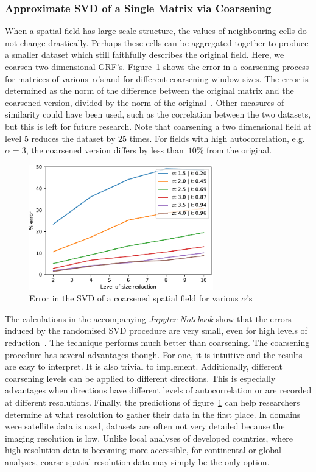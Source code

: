 \documentclass[ijgi,article,submit,moreauthors,pdftex,10pt,a4paper]{Definitions/mdpi}
\begin{document}
\subsubsection{Approximate SVD of a Single Matrix via Coarsening}
\label{sec:Results/Approximate SVD of a Single Matrix via Coarsening}
When a spatial field has large scale structure, the values of neighbouring cells do not change drastically. Perhaps these cells can be aggregated together to produce a smaller dataset which still faithfully describes the original field. Here, we coarsen two dimensional GRF's. Figure~\ref{fig:plotSingleSpatialFieldViaCoarsening} shows the error in a coarsening process for matrices of various~$\alpha$'s and for different coarsening window sizes. The error is determined as the norm of the difference between the original matrix and the coarsened version, divided by the norm of the original~\cite{Bogaardt2018}. Other measures of similarity could have been used, such as the correlation between the two datasets, but this is left for future research. Note that coarsening a two dimensional field at level 5 reduces the dataset by $25$ times. For fields with high autocorrelation, e.g. $\alpha=3$, the coarsened version differs by less than~$10\%$ from the original.

\begin{figure}[H]
\centering
\includegraphics[width=80mm]{Results/plotSingleSpatialFieldViaCoarsening.pdf}
\caption[Error after coarsening]{Error in the SVD of a coarsened spatial field for various $\alpha$'s}
\label{fig:plotSingleSpatialFieldViaCoarsening}
\end{figure}

The calculations in the accompanying \textit{Jupyter Notebook} show that the errors induced by the randomised SVD procedure are very small, even for high levels of reduction~\cite{Bogaardt2018}. The technique performs much better than coarsening. The coarsening procedure has several advantages though. For one, it is intuitive and the results are easy to interpret. It is also trivial to implement. Additionally, different coarsening levels can be applied to different directions. This is especially advantages when directions have different levels of autocorrelation or are recorded at different resolutions. Finally, the predictions of figure~\ref{fig:plotSingleSpatialFieldViaCoarsening} can help researchers determine at what resolution to gather their data in the first place. In domains were satellite data is used, datasets are often not very detailed because the imaging resolution is low. Unlike local analyses of developed countries, where high resolution data is becoming more accessible, for continental or global analyses, coarse spatial resolution data may simply be the only option.
\end{document}
